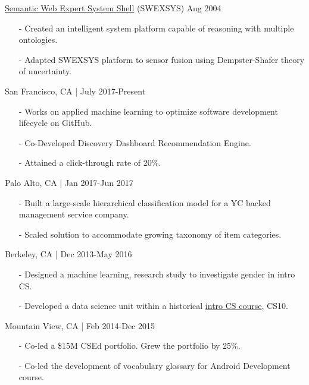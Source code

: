 \documentclass[11pt,article,oneside]{memoir}
\begin{document}
\ind \href{https://github.com/omoju/SWEXSYS}{Semantic Web Expert System Shell} (SWEXSYS) \hfill Aug 2004
\begin{itemize}[noitemsep,nolistsep]
\item[-] Created an intelligent system platform capable of reasoning with multiple ontologies.
\item[-] Adapted SWEXSYS platform to sensor fusion using Dempster-Shafer theory of uncertainty.
\end{itemize}

\bigskip

\medskip

 \hfill San Francisco, CA | July 2017-Present
\begin{itemize}[nolistsep]
\item[-]Works on applied machine learning to optimize software development lifecycle on GitHub.
\item[-]Co-Developed Discovery Dashboard Recommendation Engine.
\item[-]Attained a click-through rate of 20\%.
\end{itemize} 

 \hfill Palo Alto, CA | Jan 2017-Jun 2017
\begin{itemize}[nolistsep]
\item[-]Built a large-scale hierarchical classification model for a YC backed management service company.
\item[-]Scaled solution to accommodate growing taxonomy of item categories.
\end{itemize} 

 \hfill Berkeley, CA | Dec 2013-May 2016
\begin{itemize}[noitemsep,nolistsep]
\item[-] Designed a machine learning, research study to investigate gender in intro CS.
\item[-] Developed a data science unit within a historical \href{http://www.whitehouse.gov/the-press-office/2014/12/08/fact-sheet-new-commitments-support-computer-science-education}{intro CS course}, CS10.
\end{itemize}

 \hfill Mountain View, CA | Feb 2014-Dec 2015
\begin{itemize}[nolistsep]
\item[-]Co-led a \$15M CSEd portfolio. Grew the portfolio by 25\%.
\item[-]Co-led the development of vocabulary glossary for Android Development course.
\end{itemize} 
\end{document}
